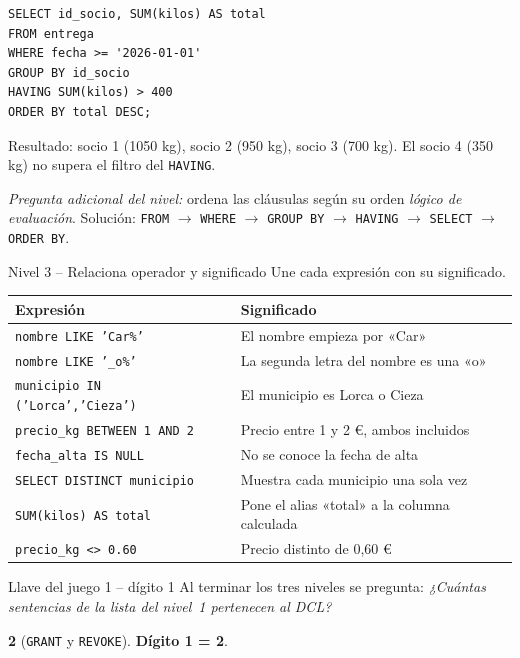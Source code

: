 \documentclass[11pt,a4paper]{article}
\begin{document}
\begin{solucion}
\begin{lstlisting}
SELECT id_socio, SUM(kilos) AS total
FROM entrega
WHERE fecha >= '2026-01-01'
GROUP BY id_socio
HAVING SUM(kilos) > 400
ORDER BY total DESC;
\end{lstlisting}
Resultado: socio 1 (1050 kg), socio 2 (950 kg), socio 3 (700 kg). El socio 4
(350 kg) no supera el filtro del \texttt{HAVING}.

\smallskip
\emph{Pregunta adicional del nivel:} ordena las cláusulas según su orden \emph{lógico de
evaluación}. Solución: \texttt{FROM} $\rightarrow$ \texttt{WHERE} $\rightarrow$
\texttt{GROUP BY} $\rightarrow$ \texttt{HAVING} $\rightarrow$ \texttt{SELECT}
$\rightarrow$ \texttt{ORDER BY}.
\end{solucion}

\begin{reto}{Nivel 3 -- Relaciona operador y significado}
Une cada expresión con su significado.
\end{reto}

\begin{solucion}
\begin{tabularx}{\linewidth}{@{}lX@{}}
\toprule
\textbf{Expresión} & \textbf{Significado} \\
\midrule
\texttt{nombre LIKE 'Car\%'} & El nombre empieza por «Car» \\
\texttt{nombre LIKE '\_o\%'} & La segunda letra del nombre es una «o» \\
\texttt{municipio IN ('Lorca','Cieza')} & El municipio es Lorca o Cieza \\
\texttt{precio\_kg BETWEEN 1 AND 2} & Precio entre 1 y 2 €, ambos incluidos \\
\texttt{fecha\_alta IS NULL} & No se conoce la fecha de alta \\
\texttt{SELECT DISTINCT municipio} & Muestra cada municipio una sola vez \\
\texttt{SUM(kilos) AS total} & Pone el alias «total» a la columna calculada \\
\texttt{precio\_kg <> 0.60} & Precio distinto de 0,60 € \\
\bottomrule
\end{tabularx}
\end{solucion}

\begin{reto}{Llave del juego 1 -- dígito 1}
Al terminar los tres niveles se pregunta: \emph{¿Cuántas sentencias de la lista del
nivel~1 pertenecen al DCL?}
\end{reto}
\begin{solucion}
\textbf{2} (\texttt{GRANT} y \texttt{REVOKE}). \quad \textbf{Dígito 1 = 2}.
\end{solucion}
\end{document}

